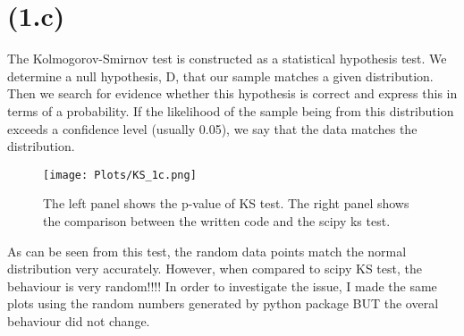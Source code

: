 \section{(1.c)}

The Kolmogorov-Smirnov test is constructed as a statistical hypothesis test.
We determine a null hypothesis, D, that our sample matches a given distribution.
Then we search for evidence whether this hypothesis is correct and express this in terms of a probability.
If the likelihood of the sample being from this distribution exceeds a confidence level (usually 0.05), we say that the data matches the distribution.
\begin{figure}[!htb]
  \centering
  \texttt{[image: Plots/KS\_1c.png]}
  \caption{The left panel shows the p-value of KS test. The right panel shows the comparison between the written code and the scipy ks test. }
  \label{fig:fig4}
\end{figure}




As can be seen from this test, the random data points match the normal distribution very accurately. 
However, when compared to scipy KS test, the behaviour is very random!!!! 
In order to investigate the issue, I made the same plots using the random numbers generated by python package BUT the overal behaviour did not change.


